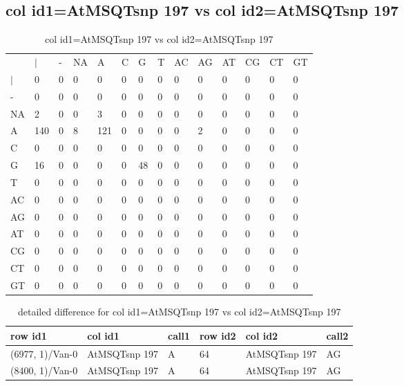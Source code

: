 \subsection{col id1=AtMSQTsnp 197 vs col id2=AtMSQTsnp 197}
\begin{center}
\begin{longtable}{|l|l|l|l|l|l|l|l|l|l|l|l|l|l|}
\caption{col id1=AtMSQTsnp 197 vs col id2=AtMSQTsnp 197} \label{table_dm762}\\
\hline
\\
\hline
&$|$&-&NA&A&C&G&T&AC&AG&AT&CG&CT&GT\\
$|$&0&0&0&0&0&0&0&0&0&0&0&0&0\\
-&0&0&0&0&0&0&0&0&0&0&0&0&0\\
NA&2&0&0&3&0&0&0&0&0&0&0&0&0\\
A&140&0&8&121&0&0&0&0&2&0&0&0&0\\
C&0&0&0&0&0&0&0&0&0&0&0&0&0\\
G&16&0&0&0&0&48&0&0&0&0&0&0&0\\
T&0&0&0&0&0&0&0&0&0&0&0&0&0\\
AC&0&0&0&0&0&0&0&0&0&0&0&0&0\\
AG&0&0&0&0&0&0&0&0&0&0&0&0&0\\
AT&0&0&0&0&0&0&0&0&0&0&0&0&0\\
CG&0&0&0&0&0&0&0&0&0&0&0&0&0\\
CT&0&0&0&0&0&0&0&0&0&0&0&0&0\\
GT&0&0&0&0&0&0&0&0&0&0&0&0&0\\
\hline
\end{longtable}
\end{center}

\begin{center}
\begin{longtable}{|l|l|l|l|l|l|}
\caption{detailed difference for col id1=AtMSQTsnp 197 vs col id2=AtMSQTsnp 197} \label{table_dm763}\\
\hline
row id1&col id1&call1&row id2&col id2&call2\\
\hline
(6977, 1)/Van-0&AtMSQTsnp 197&A&64&AtMSQTsnp 197&AG\\
(8400, 1)/Van-0&AtMSQTsnp 197&A&64&AtMSQTsnp 197&AG\\
\hline
\end{longtable}
\end{center}

